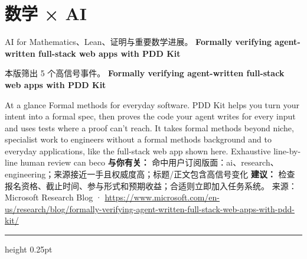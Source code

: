 \documentclass[10.5pt]{ctexart}
\begin{document}
\section*{数学 × AI}
{\color{ormuted} AI for Mathematics、Lean、证明与重要数学进展。}
\vspace{2mm}
{\LARGE\bfseries Formally verifying agent-written full-stack web apps with PDD Kit}\par
\vspace{1mm}
{\color{ormuted} 本版筛出 5 个高信号事件。}
\vspace{3mm}
{\Large\bfseries Formally verifying agent-written full-stack web apps with PDD Kit}\par
At a glance Formal methods for everyday software. PDD Kit helps you turn your intent into a formal spec, then proves the code your agent writes for every input and uses tests where a proof can’t reach. It takes formal methods beyond niche, specialist work to engineers without a formal methods background and to everyday applications, like the full-stack web app shown here. Exhaustive line-by-line human review can beco
\textbf{与你有关：} 命中用户订阅版面：ai、research、engineering；来源接近一手且权威度高；标题/正文包含高信号变化
\textbf{建议：} 检查报名资格、截止时间、参与形式和预期收益；合适则立即加入任务系统。
{\footnotesize\color{ormuted} 来源：Microsoft Research Blog · \url{https://www.microsoft.com/en-us/research/blog/formally-verifying-agent-written-full-stack-web-apps-with-pdd-kit/}}
\vspace{4mm}
\hrule height 0.25pt
\vspace{3mm}
\end{document}
